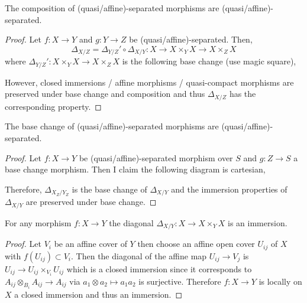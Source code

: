 \documentclass[12pt]{article}
\begin{document}
\begin{lemma}
The composition of (quasi/affine)-separated morphisms are (quasi/affine)-separated. 
\end{lemma}

\begin{proof}
Let $f : X \to Y$ and $g : Y \to Z$ be (quasi/affine)-separated. Then,
\[ \Delta_{X/Z} = \Delta_{Y/Z}' \circ \Delta_{X/Y} : X \to X \times_Y X \to X \times_Z X \]
where $\Delta_{Y/Z}' : X \times_Y X \to X \times_Z X$ is the following base change (use magic square),
\begin{center}
\end{center}
However, closed immersions / affine morphisms / quasi-compact morphisms are preserved under base change and composition and thus $\Delta_{X/Z}$ has the corresponding property.
\end{proof}

\begin{lemma}
The base change of (quasi/affine)-separated morphisms are (quasi/affine)-separated. 
\end{lemma}

\begin{proof}
Let $f : X \to Y$ be (quasi/affine)-separated morphism over $S$ and $g : Z \to S$ a base change morphism. Then I claim the following diagram is cartesian,
\begin{center}
\end{center}
Therefore, $\Delta_{X_Z/Y_Z}$ is the base change of $\Delta_{X/Y}$ and the immersion properties of $\Delta_{X/Y}$ are preserved under base change.
\end{proof}

\begin{lemma}
For any morphism $f : X \to Y$ the diagonal $\Delta_{X / Y} : X \to X \times_Y X$ is an immersion.
\end{lemma}

\begin{proof}
Let $V_i$ be an affine cover of $Y$ then choose an affine open cover $U_{ij}$ of $X$ with $f(U_{ij}) \subset V_i$. Then the diagonal of the affine map $U_{ij} \to V_j$ is $U_{ij} \to U_{ij} \times_{V_i} U_{ij}$ which is a closed immersion since it corresponds to $A_{ij} \otimes_{B_i} A_{ij} \to A_{ij}$ via $a_1 \otimes a_2 \mapsto a_1 a_2$ is surjective. Therefore $f : X \to Y$ is locally on $X$ a closed immersion and thus an immersion. 
\end{proof}
\end{document}
